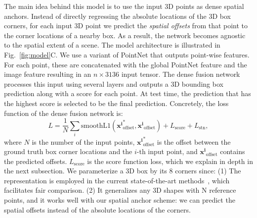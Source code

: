 \documentclass[10pt,twocolumn,letterpaper]{article}
\begin{document}
 The main idea behind this model is to use the input 3D points as dense spatial anchors. Instead of directly regressing the absolute locations of the 3D box corners, for each input 3D point we predict the \textit{spatial offsets} from that point to the corner locations of a nearby box. As a result, the network becomes agnostic to the spatial extent of a scene. The model architecture is illustrated in Fig.~\ref{fig:model}C. We use a variant of PointNet that outputs point-wise features. For each point, these are concatenated with the global PointNet feature and the image feature resulting in an $n \times 3136$ input tensor. The dense fusion network processes this input using several layers and outputs a 3D bounding box prediction along with a score for each point. At test time, the prediction that has the highest score is selected to be the final prediction. Concretely, the loss function of the dense fusion network is:
\begin{equation}
    L = \frac{1}{N} \sum_i \mathrm{smoothL1} (\mathbf{x^i}^*_{\mathrm{offset}},\mathbf{x^i}_{\mathrm{offset}}) + L_{\mathrm{score}} + L_{\mathrm{stn}},
\end{equation}
where $N$ is the number of the input points, $\mathbf{x^i}^*_{\mathrm{offset}}$ is the offset between the ground truth box corner locations and the $i$-th input point, and $\mathbf{x^i}_{\mathrm{offset}}$ contains the predicted offsets. $L_{\mathrm{score}}$ is the score function loss, which we explain in depth in the next subsection. 
 We parameterize a 3D box by its 8 corners since: (1) The representation is employed in the current state-of-the-art methods~\cite{velofcn,mv3d}, which facilitates fair comparison. (2) It generalizes any 3D shapes with N reference points, and it works well with our spatial anchor scheme: we can predict the spatial offsets instead of the absolute locations of the corners.
\end{document}
